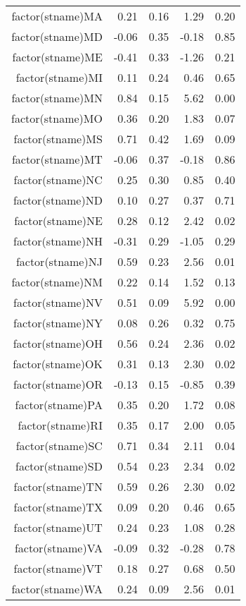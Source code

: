 \begin{table}[ht]
\begin{tabular}{rrrrr}
  factor(stname)MA & 0.21 & 0.16 & 1.29 & 0.20 \\ 
  factor(stname)MD & -0.06 & 0.35 & -0.18 & 0.85 \\ 
  factor(stname)ME & -0.41 & 0.33 & -1.26 & 0.21 \\ 
  factor(stname)MI & 0.11 & 0.24 & 0.46 & 0.65 \\ 
  factor(stname)MN & 0.84 & 0.15 & 5.62 & 0.00 \\ 
  factor(stname)MO & 0.36 & 0.20 & 1.83 & 0.07 \\ 
  factor(stname)MS & 0.71 & 0.42 & 1.69 & 0.09 \\ 
  factor(stname)MT & -0.06 & 0.37 & -0.18 & 0.86 \\ 
  factor(stname)NC & 0.25 & 0.30 & 0.85 & 0.40 \\ 
  factor(stname)ND & 0.10 & 0.27 & 0.37 & 0.71 \\ 
  factor(stname)NE & 0.28 & 0.12 & 2.42 & 0.02 \\ 
  factor(stname)NH & -0.31 & 0.29 & -1.05 & 0.29 \\ 
  factor(stname)NJ & 0.59 & 0.23 & 2.56 & 0.01 \\ 
  factor(stname)NM & 0.22 & 0.14 & 1.52 & 0.13 \\ 
  factor(stname)NV & 0.51 & 0.09 & 5.92 & 0.00 \\ 
  factor(stname)NY & 0.08 & 0.26 & 0.32 & 0.75 \\ 
  factor(stname)OH & 0.56 & 0.24 & 2.36 & 0.02 \\ 
  factor(stname)OK & 0.31 & 0.13 & 2.30 & 0.02 \\ 
  factor(stname)OR & -0.13 & 0.15 & -0.85 & 0.39 \\ 
  factor(stname)PA & 0.35 & 0.20 & 1.72 & 0.08 \\ 
  factor(stname)RI & 0.35 & 0.17 & 2.00 & 0.05 \\ 
  factor(stname)SC & 0.71 & 0.34 & 2.11 & 0.04 \\ 
  factor(stname)SD & 0.54 & 0.23 & 2.34 & 0.02 \\ 
  factor(stname)TN & 0.59 & 0.26 & 2.30 & 0.02 \\ 
  factor(stname)TX & 0.09 & 0.20 & 0.46 & 0.65 \\ 
  factor(stname)UT & 0.24 & 0.23 & 1.08 & 0.28 \\ 
  factor(stname)VA & -0.09 & 0.32 & -0.28 & 0.78 \\ 
  factor(stname)VT & 0.18 & 0.27 & 0.68 & 0.50 \\ 
  factor(stname)WA & 0.24 & 0.09 & 2.56 & 0.01 \\ 

\end{tabular}
\end{table}
